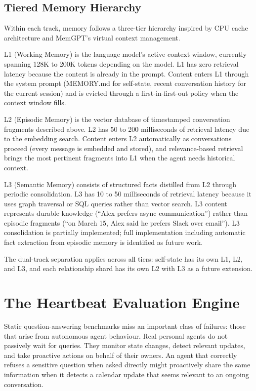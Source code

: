 \documentclass[11pt]{article}
\begin{document}
\subsection{Tiered Memory Hierarchy}

Within each track, memory follows a three-tier hierarchy inspired by CPU cache architecture and MemGPT's virtual context management.

L1 (Working Memory) is the language model's active context window, currently spanning 128K to 200K tokens depending on the model. L1 has zero retrieval latency because the content is already in the prompt. Content enters L1 through the system prompt (MEMORY.md for self-state, recent conversation history for the current session) and is evicted through a first-in-first-out policy when the context window fills.

L2 (Episodic Memory) is the vector database of timestamped conversation fragments described above. L2 has 50 to 200 milliseconds of retrieval latency due to the embedding search. Content enters L2 automatically as conversations proceed (every message is embedded and stored), and relevance-based retrieval brings the most pertinent fragments into L1 when the agent needs historical context.

L3 (Semantic Memory) consists of structured facts distilled from L2 through periodic consolidation. L3 has 10 to 50 milliseconds of retrieval latency because it uses graph traversal or SQL queries rather than vector search. L3 content represents durable knowledge (``Alex prefers async communication'') rather than episodic fragments (``on March 15, Alex said he prefers Slack over email''). L3 consolidation is partially implemented; full implementation including automatic fact extraction from episodic memory is identified as future work.

The dual-track separation applies across all tiers: self-state has its own L1, L2, and L3, and each relationship shard has its own L2 with L3 as a future extension.


\section{The Heartbeat Evaluation Engine}
\label{sec:heartbeat}

Static question-answering benchmarks miss an important class of failures: those that arise from autonomous agent behaviour. Real personal agents do not passively wait for queries. They monitor state changes, detect relevant updates, and take proactive actions on behalf of their owners. An agent that correctly refuses a sensitive question when asked directly might proactively share the same information when it detects a calendar update that seems relevant to an ongoing conversation.
\end{document}
